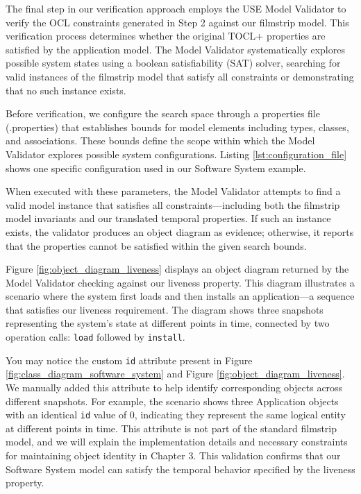 \hspace{1cm} The final step in our verification approach employs the USE Model 
Validator \cite{USE_Validator} to verify the OCL constraints generated in Step 2 
against our filmstrip model. This verification process determines whether the 
original TOCL+ properties are satisfied by the application model. The Model Validator 
systematically explores possible system states using a boolean satisfiability (SAT) 
solver, searching for valid instances of the filmstrip model that satisfy all 
constraints or demonstrating that no such instance exists.

Before verification, we configure the search space through a properties file 
(.properties) that establishes bounds for model elements including types, classes, 
and associations. These bounds define the scope within which the Model Validator 
explores possible system configurations. Listing \ref{lst:configuration_file} shows 
one specific configuration used in our Software System example.

When executed with these parameters, the Model Validator attempts to find a valid 
model instance that satisfies all constraints—including both the filmstrip model 
invariants and our translated temporal properties. If such an instance exists, the 
validator produces an object diagram as evidence; otherwise, it reports that the 
properties cannot be satisfied within the given search bounds.

Figure \ref{fig:object_diagram_liveness} displays an object diagram returned by the 
Model Validator checking against our liveness property. This diagram illustrates a scenario where 
the system first loads and then installs an application—a sequence that satisfies our 
liveness requirement. The diagram shows three snapshots representing the system's 
state at different points in time, connected by two operation calls: \texttt{load} 
followed by \texttt{install}.

You may notice the custom \texttt{id} attribute present in Figure \ref{fig:class_diagram_software_system}
and Figure \ref{fig:object_diagram_liveness}. We manually added this attribute to help 
identify corresponding objects across different snapshots. For example, the scenario 
shows three Application objects with an identical \texttt{id} value of 0, indicating 
they represent the same logical entity at different points in time. This attribute 
is not part of the standard filmstrip model, and we will explain the implementation 
details and necessary constraints for maintaining object identity in Chapter 3. 
This validation confirms that our Software System model can satisfy the temporal 
behavior specified by the liveness property.

